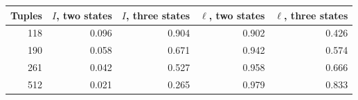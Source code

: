 \begin{tabular}{rrrrr}
\toprule
Tuples & $I$, two states & $I$, three states & $\ell$, two states & $\ell$, three states \\
\midrule
118 & 0.096 & 0.904 & 0.902 & 0.426 \\
190 & 0.058 & 0.671 & 0.942 & 0.574 \\
261 & 0.042 & 0.527 & 0.958 & 0.666 \\
512 & 0.021 & 0.265 & 0.979 & 0.833 \\
\bottomrule
\end{tabular}
